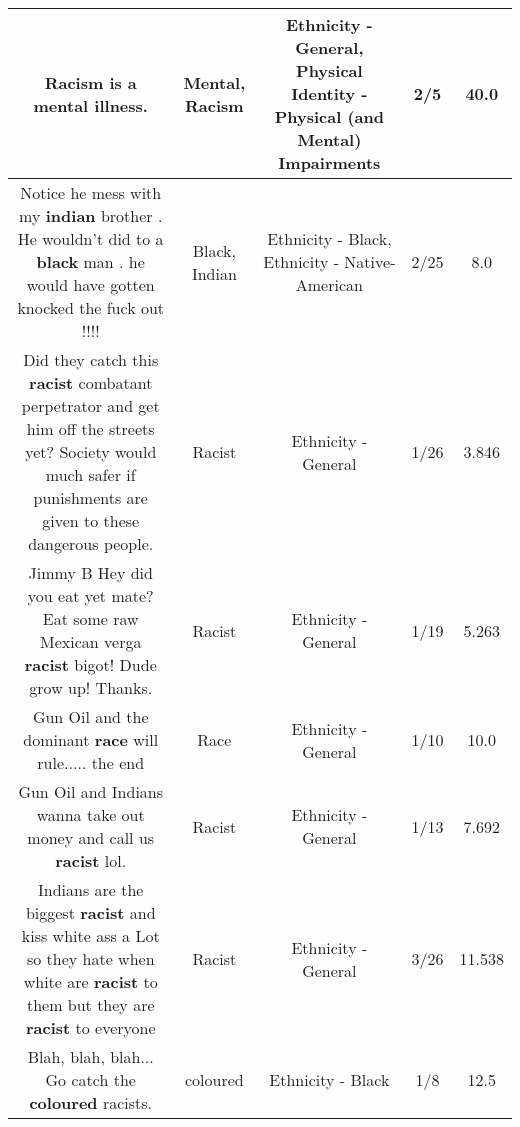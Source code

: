 \documentclass[11pt]{article}
\newlength\mylength
\begin{document}
\begin{center}
\begin{longtable}{|C{.65\mylength}|C{.30\mylength}|C{.12\mylength}|C{.12\mylength}|C{.12\mylength}|}
  \small Racism is a \textbf{mental} illness.\normalsize   & Mental, Racism & Ethnicity - General, Physical Identity - Physical (and Mental) Impairments & 2/5 & 40.0 \\  \hline
  \small Notice he mess with my \textbf{indian} brother . He wouldn't did to a \textbf{black} man . he would have gotten knocked the fuck out !!!!\normalsize   & Black, Indian & Ethnicity - Black, Ethnicity - Native-American & 2/25 & 8.0 \\  \hline
  \small Did they catch this \textbf{racist} combatant perpetrator and get him off the streets yet? Society would much safer if punishments are given to these dangerous people.\normalsize   & Racist & Ethnicity - General & 1/26 & 3.846 \\  \hline
  \small Jimmy B Hey did you eat yet mate? Eat some raw Mexican verga \textbf{racist} bigot! Dude grow up! Thanks.\normalsize   & Racist & Ethnicity - General & 1/19 & 5.263 \\  \hline
  \small Gun Oil and the dominant \textbf{race} will rule..... the end\normalsize   & Race & Ethnicity - General & 1/10 & 10.0 \\  \hline
  \small Gun Oil and Indians wanna take out money and call us \textbf{racist} lol.\normalsize   & Racist & Ethnicity - General & 1/13 & 7.692 \\  \hline
  \small Indians are the biggest \textbf{racist} and  kiss white ass a Lot so they hate when white are \textbf{racist} to them but they are \textbf{racist} to everyone\normalsize   & Racist & Ethnicity - General & 3/26 & 11.538 \\  \hline
  \small Blah, blah, blah...  Go catch the \textbf{coloured} racists.\normalsize   & coloured & Ethnicity - Black & 1/8 & 12.5 \\  \hline

\end{longtable}
\end{center}
\end{document}
